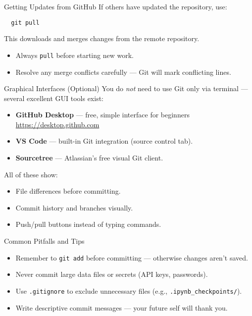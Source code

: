 \documentclass[aspectratio=169,13pt]{beamer}
\begin{document}
\begin{frame}[fragile]{Getting Updates from GitHub}
    If others have updated the repository, use:
    \begin{verbatim}
  git pull
  \end{verbatim}
    This downloads and merges changes from the remote repository.

    \vspace{0.5em}
    \begin{itemize}
        \item Always \texttt{pull} before starting new work.
        \item Resolve any merge conflicts carefully — Git will mark conflicting lines.
    \end{itemize}
\end{frame}

\begin{frame}{Graphical Interfaces (Optional)}
    You do \emph{not} need to use Git only via terminal — several excellent GUI tools exist:

    \begin{itemize}
        \item \textbf{GitHub Desktop} — free, simple interface for beginners
              \url{https://desktop.github.com}
        \item \textbf{VS Code} — built-in Git integration (source control tab).
        \item \textbf{Sourcetree} — Atlassian’s free visual Git client.
    \end{itemize}

    \vspace{0.5em}
    All of these show:
    \begin{itemize}
        \item File differences before committing.
        \item Commit history and branches visually.
        \item Push/pull buttons instead of typing commands.
    \end{itemize}
\end{frame}

\begin{frame}{Common Pitfalls and Tips}
    \begin{itemize}
        \item Remember to \texttt{git add} before committing — otherwise changes aren’t saved.
        \item Never commit large data files or secrets (API keys, passwords).
        \item Use \texttt{.gitignore} to exclude unnecessary files (e.g., \texttt{.ipynb\_checkpoints/}).
        \item Write descriptive commit messages — your future self will thank you.
    \end{itemize}
\end{frame}
\end{document}
